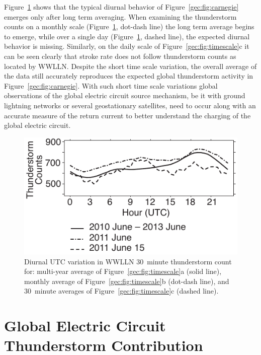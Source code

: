 Figure~\ref{gec:fig:averaging} shows that the typical diurnal behavior of Figure~\ref{gec:fig:carnegie} emerges only after long term averaging.
When examining the thunderstorm counts on a monthly scale (Figure~\ref{gec:fig:averaging}, dot-dash line) the long term average begins to emerge, while over a single day (Figure~\ref{gec:fig:averaging}, dashed line), the expected diurnal behavior is missing.
Similarly, on the daily scale of Figure~\ref{gec:fig:timescale}c it can be seen clearly that stroke rate does not follow thunderstorm counts as located by WWLLN.
Despite the short time scale variation, the overall average of the data still accurately reproduces the expected global thunderstorm activity in Figure~\ref{gec:fig:carnegie}.
With such short time scale variations global observations of the global electric circuit source mechanism, be it with ground lightning networks or several geostationary satellites, need to occur along with an accurate measure of the return current to better understand the charging of the global electric circuit.

 \begin{figure}[ht!]
    \centering
    \includegraphics[scale=1]{GEC/Figures/averaging.pdf}
    \caption{Diurnal UTC variation in WWLLN 30~minute thunderstorm count for:
    		multi-year average of Figure~\ref{gec:fig:timescale}a (solid line),
		monthly average of Figure~\ref{gec:fig:timescale}b (dot-dash line),
		and 30~minute averages of Figure~\ref{gec:fig:timescale}c (dashed line).}
    \label{gec:fig:averaging}
 \end{figure}

\section{Global Electric Circuit Thunderstorm Contribution}

